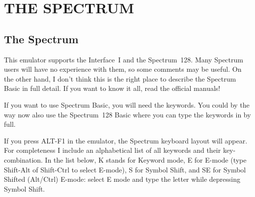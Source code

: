 \newpage


\section{THE SPECTRUM}


\subsection{The Spectrum}

    This emulator supports the Interface~I and the Spectrum~128.  Many
    Spectrum users will have no experience with them, so some comments may
    be useful.  On the other hand, I don't think this is the right place to
    describe the Spectrum Basic in full detail.  If you want to know it all,
    read the official manuals!

    If you want to use Spectrum Basic, you will need the keywords.  You
    could by the way now also use the Spectrum~128 Basic where you can type
    the keywords in by full.

    If you press ALT-F1 in the emulator, the Spectrum keyboard layout will
    appear.  For completeness I include an alphabetical list of all keywords
    and their key-combination.  In the list below, K stands for Keyword
    mode, E for E-mode (type Shift-Alt of Shift-Ctrl to select E-mode), S
    for Symbol Shift, and SE for Symbol Shifted (Alt/Ctrl) E-mode: select E
    mode and type the letter while depressing Symbol Shift.

